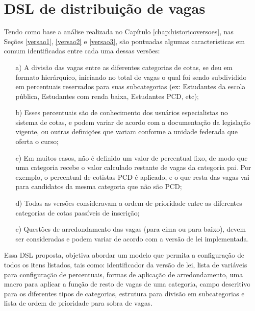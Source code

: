 \section{DSL de distribuição de vagas}
\label{sec:dslproposta:usuario}

   
 Tendo como base a análise realizada no Capítulo \ref{chap:historicoversoes}, nas Seções \ref{versao1}, \ref{versao2} e \ref{versao3}, são pontuadas algumas características em comum identificadas entre cada uma dessas versões:
   
   \begin{enumerate}
    \item[a)] A divisão das vagas entre as diferentes categorias de cotas, se deu em formato hierárquico, iniciando no total de vagas o qual foi sendo subdividido em percentuais reservados para suas subcategorias (ex: Estudantes da escola pública, Estudantes com renda baixa, Estudantes PCD, etc); 
   
   \item[b)] Esses percentuais são de conhecimento dos usuários especialistas no sistema de cotas, e podem variar de acordo com a documentação da legislação vigente, ou outras definições que variam conforme a unidade federada que oferta o curso; 
   
   \item[c)] Em muitos casos, não é definido um valor de percentual fixo, de modo que uma categoria recebe o valor calculado restante de vagas da categoria pai. Por exemplo, o percentual de cotistas \gls{PCD} é aplicado, e o que resta das vagas vai para candidatos da mesma categoria que não são \gls{PCD};

   \item[d)] Todas as versões consideravam a ordem de prioridade entre as diferentes categorias de cotas passíveis de inscrição;
   
   \item[e)] Questões de arredondamento das vagas (para cima ou para baixo), devem ser consideradas e podem variar de acordo com a versão de lei implementada.

   \end{enumerate}
   
   Essa \gls{DSL} proposta, objetiva abordar um modelo que permita a configuração de todos os itens listados, tais como: identificador da versão de lei, lista de variáveis para configuração de percentuais, formas de aplicação de arredondamento, uma macro para aplicar a função de resto de vagas de uma categoria, campo descritivo para os diferentes tipos de categorias, estrutura para divisão em subcategorias e lista de ordem de prioridade para sobra de vagas.
   
